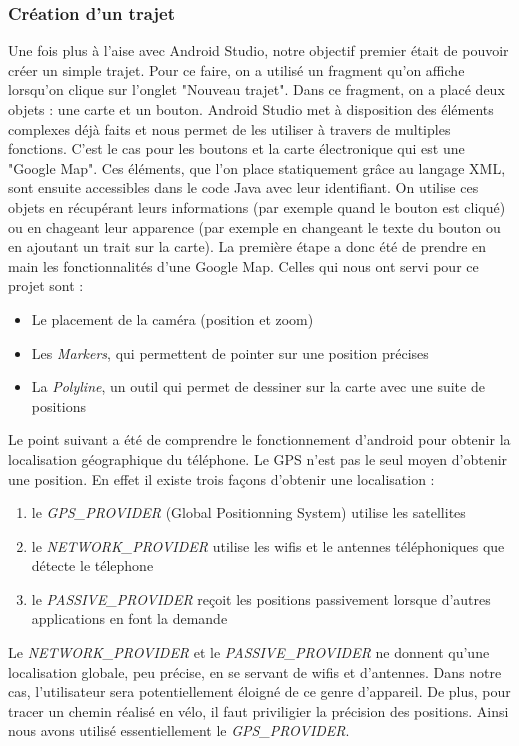 \subsubsection{Création d'un trajet}
Une fois plus à l'aise avec Android Studio, notre objectif premier était de pouvoir créer un simple trajet. Pour ce faire, on a utilisé un
fragment qu'on affiche lorsqu'on clique sur l'onglet "Nouveau trajet". Dans ce fragment, on a placé deux objets : une carte et un bouton.
Android Studio met à disposition des éléments complexes déjà faits et nous permet de les utiliser à travers de multiples fonctions. C'est le
cas pour les boutons et la carte électronique qui est une "Google Map". Ces éléments, que l'on place statiquement grâce au langage XML, sont
ensuite accessibles dans le code Java avec leur identifiant. On utilise ces objets en récupérant leurs informations
(par exemple quand le bouton est cliqué) ou en chageant leur apparence (par exemple en changeant le texte du bouton ou en ajoutant un trait
sur la carte).
La première étape a donc été de prendre en main les fonctionnalités d'une Google Map. Celles qui nous ont servi pour ce projet sont :
\begin{itemize}
  \item Le placement de la caméra (position et zoom)
  \item Les \emph{Markers}, qui permettent de pointer sur une position précises
  \item La \emph{Polyline}, un outil qui permet de dessiner sur la carte avec une suite de positions
\end{itemize}
Le point suivant a été de comprendre le fonctionnement d'android pour obtenir la localisation géographique du téléphone. Le GPS n'est pas le
seul moyen d'obtenir une position. En effet il existe trois façons d'obtenir une localisation :
\begin{enumerate}
  \item le \emph{GPS\_PROVIDER} (Global Positionning System) utilise les satellites
  \item le \emph{NETWORK\_PROVIDER} utilise les wifis et le antennes téléphoniques que détecte le télephone
  \item le \emph{PASSIVE\_PROVIDER} reçoit les positions passivement lorsque d'autres applications en font la demande
\end{enumerate}
Le \emph{NETWORK\_PROVIDER} et le \emph{PASSIVE\_PROVIDER} ne donnent qu'une localisation globale, peu précise, en se servant de wifis
et d'antennes. Dans notre cas, l'utilisateur sera potentiellement éloigné de ce genre d'appareil. De plus, pour tracer un chemin réalisé
en vélo, il faut priviligier la précision des positions. Ainsi nous avons utilisé essentiellement le \emph{GPS\_PROVIDER}.

